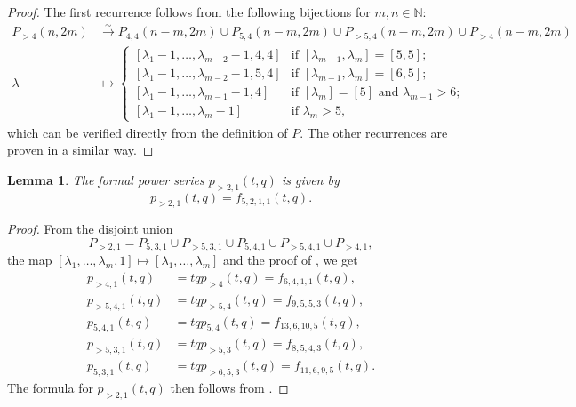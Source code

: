 \documentclass[a4paper, 12pt, reqno]{amsart}
\newtheorem{lemma}[theorem]{Lemma}
\theoremstyle{remark}
\begin{document}
\begin{proof}
  The first recurrence follows from the following bijections for $m, n \in \mathbb{N}$:
  \begin{align*}
    P_{>4}(n, 2m) &\xrightarrow{\sim} P_{4, 4}(n - m, 2m) \cup P_{5, 4}(n - m, 2m) \cup P_{>5, 4}(n - m, 2m) \cup P_{>4}(n - m, 2m) \\
    \lambda &\mapsto
              \begin{cases}
                [\lambda_1 - 1, \dots, \lambda_{m - 2} - 1, 4, 4] &\text{if }[\lambda_{m - 1}, \lambda_m] = [5, 5]; \\
                [\lambda_1 - 1, \dots, \lambda_{m - 2} - 1, 5, 4] &\text{if }[\lambda_{m - 1}, \lambda_m] = [6, 5]; \\
                [\lambda_1 - 1, \dots, \lambda_{m - 1} - 1, 4] &\text{if }[\lambda_m] = [5]\text{ and }\lambda_{m - 1} > 6; \\
                [\lambda_1 - 1, \dots, \lambda_m - 1] &\text{if }\lambda_m > 5,
              \end{cases}
  \end{align*}
  which can be verified directly from the definition of $P$.
  The other recurrences are proven in a similar way.
\end{proof}

\begin{lemma}
  \label{lmm:3}
  The formal power series $p_{>2, 1}(t, q)$ is given by
  \begin{equation*}
    p_{>2, 1}(t, q) = f_{5, 2, 1, 1}(t, q).
  \end{equation*}
\end{lemma}

\begin{proof}
  From the disjoint union
  \begin{equation*}
    P_{>2, 1} = P_{5, 3, 1} \cup P_{>5, 3, 1} \cup P_{5, 4, 1} \cup P_{>5, 4, 1} \cup P_{>4, 1},
  \end{equation*}
  the map $[\lambda_1, \dots, \lambda_m, 1] \mapsto [\lambda_1, \dots, \lambda_m]$ and the proof of , we get
  \begin{align*}
    p_{>4, 1}(t, q) &= tqp_{>4}(t, q) = f_{6, 4, 1, 1}(t, q), \\
    p_{>5, 4, 1}(t, q) &= tqp_{>5, 4}(t, q) = f_{9, 5, 5, 3}(t, q), \\
    p_{5, 4, 1}(t, q) &= tqp_{5, 4}(t, q) = f_{13, 6, 10, 5}(t, q), \\
    p_{>5, 3, 1}(t, q) &= tqp_{>5, 3}(t, q) = f_{8, 5, 4, 3}(t, q), \\
    p_{5, 3, 1}(t, q) &= tqp_{>6, 5, 3}(t, q) = f_{11, 6, 9, 5}(t, q).
  \end{align*}
  The formula for $p_{>2, 1}(t, q)$ then follows from .
\end{proof}
\end{document}
